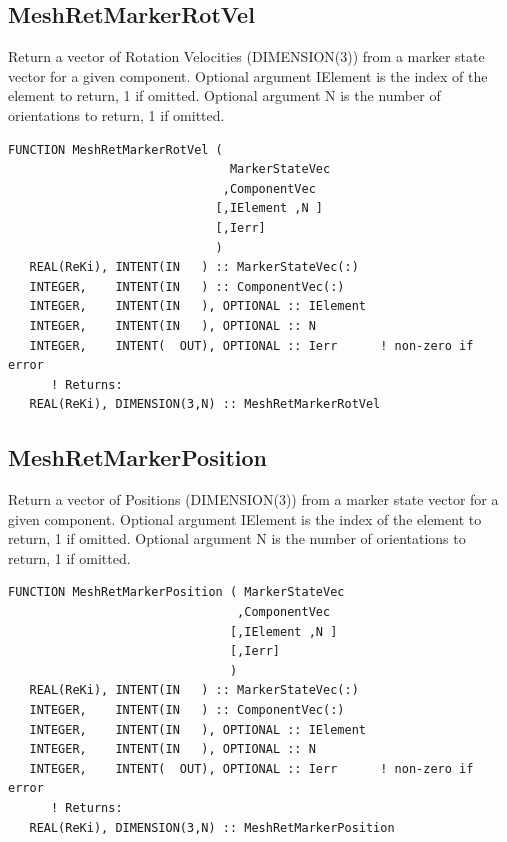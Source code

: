 \documentclass[11pt]{article}
\begin{document}
\subsection{MeshRetMarkerRotVel}
Return a vector of Rotation Velocities (DIMENSION(3)) from a marker state vector for a given component.
Optional argument IElement is the index of the element to return, 1 if omitted.
Optional argument N is the number of orientations to return, 1 if omitted.
\begin{verbatim}
FUNCTION MeshRetMarkerRotVel ( 
                               MarkerStateVec
                              ,ComponentVec 
                             [,IElement ,N ]
                             [,Ierr]
                             )
   REAL(ReKi), INTENT(IN   ) :: MarkerStateVec(:)
   INTEGER,    INTENT(IN   ) :: ComponentVec(:)
   INTEGER,    INTENT(IN   ), OPTIONAL :: IElement
   INTEGER,    INTENT(IN   ), OPTIONAL :: N
   INTEGER,    INTENT(  OUT), OPTIONAL :: Ierr 		! non-zero if error
      ! Returns:
   REAL(ReKi), DIMENSION(3,N) :: MeshRetMarkerRotVel
\end{verbatim}

\subsection{MeshRetMarkerPosition}
Return a vector of Positions (DIMENSION(3)) from a marker state vector for a given component.
Optional argument IElement is the index of the element to return, 1 if omitted.
Optional argument N is the number of orientations to return, 1 if omitted.
\begin{verbatim}
FUNCTION MeshRetMarkerPosition ( MarkerStateVec
                                ,ComponentVec 
                               [,IElement ,N ]
                               [,Ierr]
                               )
   REAL(ReKi), INTENT(IN   ) :: MarkerStateVec(:)
   INTEGER,    INTENT(IN   ) :: ComponentVec(:)
   INTEGER,    INTENT(IN   ), OPTIONAL :: IElement
   INTEGER,    INTENT(IN   ), OPTIONAL :: N
   INTEGER,    INTENT(  OUT), OPTIONAL :: Ierr 		! non-zero if error
      ! Returns:
   REAL(ReKi), DIMENSION(3,N) :: MeshRetMarkerPosition
\end{verbatim}
\end{document}
